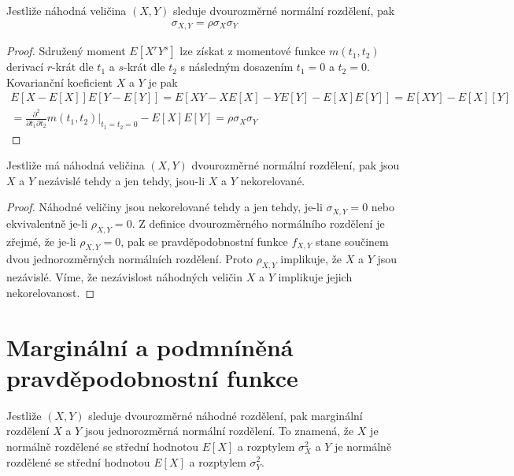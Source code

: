 \begin{theorem}
Jestliže náhodná veličina $(X,Y)$ sleduje dvourozměrné normální rozdělení, pak
\begin{gather*}
\sigma_{X,Y} = \rho \sigma_X \sigma_Y
\end{gather*}
\end{theorem}

\begin{proof}
Sdružený moment $E[X^r Y^s]$ lze získat z  momentové funkce $m(t_1, t_2)$ derivací $r$-krát dle $t_1$ a $s$-krát dle $t_2$ s následným dosazením $t_1 = 0$ a $t_2 = 0$. Kovarianční koeficient $X$ a $Y$ je pak
\begin{gather*}
E[X - E[X]]E[Y - E[Y]] = E[XY - XE[X] - YE[Y] - E[X]E[Y]] = E[XY] - E[X][Y]\\
= \frac{\partial^2}{\partial t_1 \partial t_2}m(t_1, t_2)\Big|_{t_1 = t_2 = 0} - E[X]E[Y] = \rho \sigma_X \sigma_Y
\end{gather*}
\end{proof}

\begin{theorem}
Jestliže má náhodná veličina $(X,Y)$ dvourozměrné normální rozdělení, pak jsou $X$ a $Y$ nezávislé tehdy a jen tehdy, jsou-li $X$ a $Y$ nekorelované.
\end{theorem}

\begin{proof}
Náhodné veličiny jsou nekorelované tehdy a jen tehdy, je-li $\sigma_{X,Y} = 0$ nebo ekvivalentně je-li $\rho_{X,Y} = 0$. Z definice dvourozměrného normálního rozdělení je zřejmé, že je-li $\rho_{X,Y} = 0$, pak se pravděpodobnostní funkce $f_{X,Y}$ stane součinem dvou jednorozměrných normálních rozdělení. Proto $\rho_{X,Y}$ implikuje, že $X$ a $Y$ jsou nezávislé. Víme, že nezávislost náhodných veličin $X$ a $Y$ implikuje jejich nekorelovanost.
\end{proof}

\section{Marginální a podmníněná pravděpodobnostní funkce}

\begin{theorem}
Jestliže $(X,Y)$ sleduje dvourozměrné náhodné rozdělení, pak marginální rozdělení $X$ a $Y$ jsou jednorozměrná normální rozdělení. To znamená, že $X$ je normálně rozdělené se střední hodnotou $E[X]$ a rozptylem $\sigma_X^2$ a $Y$ je normálně rozdělené se střední hodnotou $E[X]$ a rozptylem $\sigma_Y^2$.
\end{theorem}

